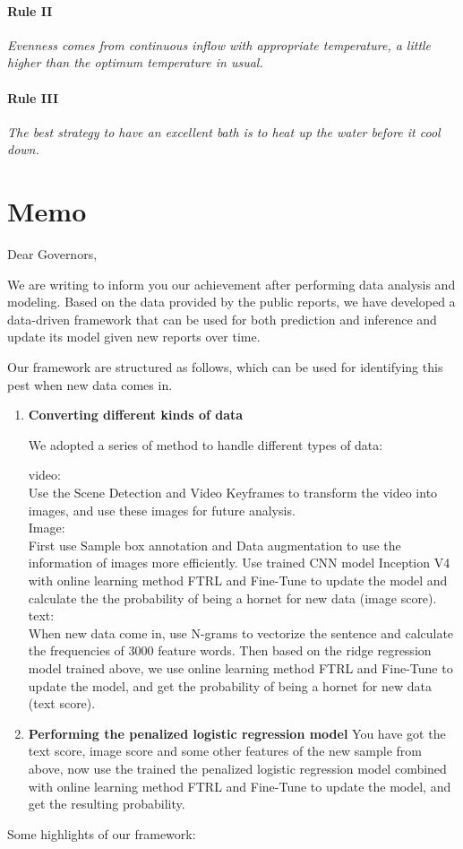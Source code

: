 \documentclass[12pt]{article}
\begin{document}
\paragraph{Rule II}
\emph{Evenness comes from continuous inflow with appropriate temperature, a little higher than the
	optimum temperature in usual.}
\paragraph{Rule III}
\emph{The best strategy to have an excellent bath is to heat up the water before it cool down.}

\clearpage
\section*{Memo}
	\begin{flushleft}
		Dear Governors,
	\end{flushleft}
	
	We are writing to inform you our achievement after performing data analysis and modeling. Based on the data provided by the public reports, we have developed a data-driven framework that can be used for both prediction and inference and update its model given new reports over time.

	Our framework are structured as follows, which can be used for identifying this pest when new data comes in.
	\begin{enumerate}[\bf 1.]
		\item \textbf{Converting different kinds of data }
		
		We adopted a series of method to handle different types of data:
		
		video:\\
		Use the Scene Detection and Video Keyframes to transform the video into images, and use these images for future analysis.\\
		Image:\\
		First use Sample box annotation and Data augmentation to use the information of images more efficiently. Use trained CNN model Inception V4 with online learning method FTRL and Fine-Tune to update the model and calculate the the probability of being a hornet for new data (image score).
		text:\\
		When new data come in, use N-grams to vectorize the sentence and calculate the frequencies of 3000 feature words. Then based on the ridge regression model trained above, we use online learning method FTRL and Fine-Tune to update the model, and get the probability of being a hornet for new data (text score).
		\item \textbf{Performing the penalized logistic regression model}
		You have got the text score, image score and some other features of the new sample from above, now use the trained the penalized logistic regression model combined with online learning method FTRL and Fine-Tune to update the model, and get the resulting probability.
	\end{enumerate}
	Some highlights of our framework:
	
\end{document}
